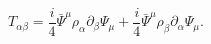\begin{equation}
T_{\alpha\beta}=\frac{i}{4}\bar{\Psi}^{\mu}\rho_{\alpha}\partial_{\beta}\Psi_{\mu}+\frac{i}{4}\bar{\Psi}^{\mu}\rho_{\beta}\partial_{\alpha}\Psi_{\mu}.
\end{equation}

